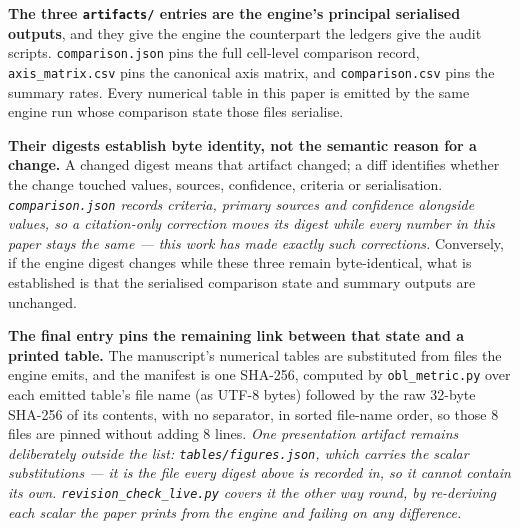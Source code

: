 \documentclass[
]{article}
\begin{document}
\textbf{The three \texttt{artifacts/} entries are the engine's principal
serialised outputs}, and they give the engine the counterpart the
ledgers give the audit scripts. \texttt{comparison.json} pins the full
cell-level comparison record, \texttt{axis\_matrix.csv} pins the
canonical axis matrix, and \texttt{comparison.csv} pins the summary
rates. Every numerical table in this paper is emitted by the same engine
run whose comparison state those files serialise.

\textbf{Their digests establish byte identity, not the semantic reason
for a change.} A changed digest means that artifact changed; a diff
identifies whether the change touched values, sources, confidence,
criteria or serialisation. \emph{\texttt{comparison.json} records
criteria, primary sources and confidence alongside values, so a
citation-only correction moves its digest while every number in this
paper stays the same --- this work has made exactly such corrections.}
Conversely, if the engine digest changes while these three remain
byte-identical, what is established is that the serialised comparison
state and summary outputs are unchanged.

\textbf{The final entry pins the remaining link between that state and a
printed table.} The manuscript's numerical tables are substituted from
files the engine emits, and the manifest is one SHA-256, computed by
\texttt{obl\_metric.py} over each emitted table's file name (as UTF-8
bytes) followed by the raw 32-byte SHA-256 of its contents, with no
separator, in sorted file-name order, so those 8 files are pinned
without adding 8 lines. \emph{One presentation artifact remains
deliberately outside the list: \texttt{tables/figures.json}, which
carries the scalar substitutions --- it is the file every digest above
is recorded in, so it cannot contain its own.
\texttt{revision\_check\_live.py} covers it the other way round, by
re-deriving each scalar the paper prints from the engine and failing on
any difference.}
\end{document}
